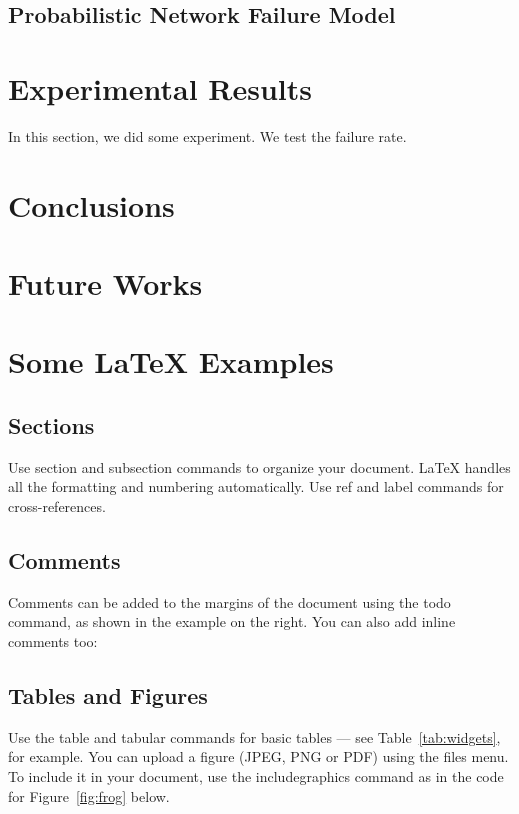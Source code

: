 \subsection{Probabilistic Network Failure Model}

\section{Experimental Results}
In this section, we did some experiment. We test the failure rate.

\section{Conclusions}


\section{Future Works}

\section{Some \LaTeX{} Examples}
\label{sec:examples}

\subsection{Sections}

Use section and subsection commands to organize your document. \LaTeX{} handles all the formatting and numbering automatically. Use ref and label commands for cross-references.

\subsection{Comments}

Comments can be added to the margins of the document using the  todo command, as shown in the example on the right. You can also add inline comments too:


\subsection{Tables and Figures}

Use the table and tabular commands for basic tables --- see Table~\ref{tab:widgets}, for example. You can upload a figure (JPEG, PNG or PDF) using the files menu. To include it in your document, use the includegraphics command as in the code for Figure~\ref{fig:frog} below.

